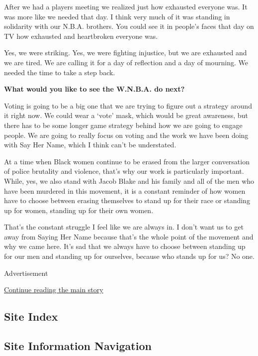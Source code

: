 After we had a players meeting we realized just how exhausted everyone
was. It was more like we needed that day. I think very much of it was
standing in solidarity with our N.B.A. brothers. You could see it in
people's faces that day on TV how exhausted and heartbroken everyone
was.

Yes, we were striking. Yes, we were fighting injustice, but we are
exhausted and we are tired. We are calling it for a day of reflection
and a day of mourning. We needed the time to take a step back.

\textbf{What would you like to see the W.N.B.A. do next?}

Voting is going to be a big one that we are trying to figure out a
strategy around it right now. We could wear a `vote' mask, which would
be great awareness, but there has to be some longer game strategy behind
how we are going to engage people. We are going to really focus on
voting and the work we have been doing with Say Her Name, which I think
can't be understated.

At a time when Black women continue to be erased from the larger
conversation of police brutality and violence, that's why our work is
particularly important. While, yes, we also stand with Jacob Blake and
his family and all of the men who have been murdered in this movement,
it is a constant reminder of how women have to choose between erasing
themselves to stand up for their race or standing up for women, standing
up for their own women.

That's the constant struggle I feel like we are always in. I don't want
us to get away from Saying Her Name because that's the whole point of
the movement and why we came here. It's sad that we always have to
choose between standing up for our men and standing up for ourselves,
because who stands up for us? No one.

Advertisement

\protect\hyperlink{after-bottom}{Continue reading the main story}

\hypertarget{site-index}{%
\subsection{Site Index}\label{site-index}}

\hypertarget{site-information-navigation}{%
\subsection{Site Information
Navigation}\label{site-information-navigation}}

